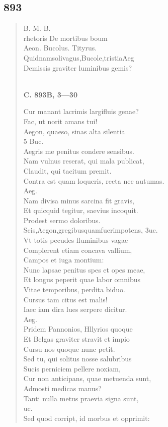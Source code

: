 \documentclass[11pt, a4paper]{report}
\begin{document}
            \subsection*{893}
      \begin{verse}
      B. M. B. \\ rhetoris De mortibus boum \\ Aeon. Bucolus. Tityrus. \\ Quidnamsolivagus,Bucole,tristiaAeg \\ Demissis graviter luminibus gemis? \\ 
        ﻿\pagebreak 
    \begin{center} \textbf{C. 893B, 3—30} \end{center} \marginpar{[335]} Cur manant lacrimis largifluis genae? \\ Fac, ut norit amans tui! \\ Aegon, quaeso, sinas alta silentia \\ 5 Buc. \\ Aegris me penitus condere sensibus. \\ Nam vulnus reserat, qui mala publicat, \\ Claudit, qui tacitum premit. \\ Contra est quam loqueris, recta nec autumas. \\ Aeg. \\ Nam divisa minus sarcina fit gravis, \\ Et quicquid tegitur, saevius incoquit. \\ Prodest sermo doloribus. \\ Scis,Aegon,gregibusquamfuerimpotens, \lbrack 3uc. \rbrack  \\ Vt totis pecudes fluminibus vagae \\ Complerent etiam concava vallium, \\ Campos et iuga montium: \\ Nunc lapsae penitus spes et opes meae, \\ Et longus peperit quae labor omnibus \\ Vitae temporibus, perdita biduo. \\ Cursus tam citus est malis! \\ Iaec iam dira lues serpere dicitur. \\ Aeg. \\ Pridem Pannonios, Hllyrios quoque \\ Et Belgas graviter stravit et impio \\ Cursu nos quoque nunc petit. \\ Sed tu, qui solitus nosse salubribus \\ Sucis perniciem pellere noxiam, \\ Cur non anticipans, quae metuenda sunt, \\ Admosti medicas manus? \\ Tanti nulla metus praevia signa sunt, \\ uc. \\ Sed quod corript, id morbus et opprimit: \\ 

\end{verse}
\end{document}

